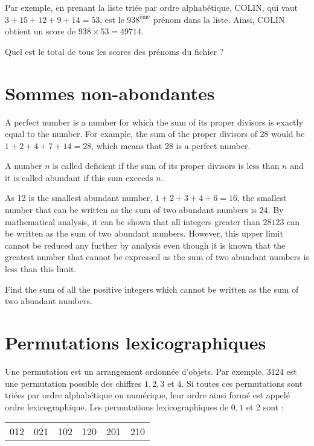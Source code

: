 Par exemple, en prenant la liste triée par ordre alphabétique, COLIN, qui vaut $3 + 15 + 12 + 9 + 14 = 53$, est le $938^{\text{ème}}$ prénom dans la liste. Ainsi, COLIN obtient un score de $938 \times 53 = 49714$.

Quel est le total de tous les scores des prénoms du fichier ?


\section{Sommes non-abondantes} \label{pb.023}
A perfect number is a number for which the sum of its proper divisors is exactly equal to the number. For example, the sum of the proper divisors of $28$ would be $1 + 2 + 4 + 7 + 14 = 28$, which means that $28$ is a perfect number.

A number $n$ is called deficient if the sum of its proper divisors is less than $n$ and it is called abundant if this sum exceeds $n$.

As 12 is the smallest abundant number, $1 + 2 + 3 + 4 + 6 = 16$, the smallest number that can be written as the sum of two abundant numbers is $24$. By mathematical analysis, it can be shown that all integers greater than $28123$ can be written as the sum of two abundant numbers. However, this upper limit cannot be reduced any further by analysis even though it is known that the greatest number that cannot be expressed as the sum of two abundant numbers is less than this limit.

Find the sum of all the positive integers which cannot be written as the sum of two abundant numbers.

\newpage


\section{Permutations lexicographiques} \label{pb.024}
Une permutation est un arrangement ordonnée d'objets.
Par exemple, $3124$ est une permutation possible des chiffres $1, 2, 3$ et $4$. Si toutes ces permutations sont triées par ordre alphabétique ou numérique, leur ordre ainsi formé est appelé ordre lexicographique. Les permutations lexicographiques de $0, 1$ et $2$ sont :

\begin{center}
    \begin{tabular}{cccccc}
        012 & 021 & 102 & 120 & 201 & 210\\
    \end{tabular}
\end{center}

